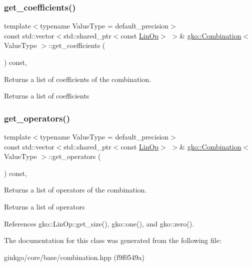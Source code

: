 \subsubsection{\texorpdfstring{get\+\_\+coefficients()}{get\_coefficients()}}
{\footnotesize\ttfamily template$<$typename Value\+Type  = default\+\_\+precision$>$ \\
const std\+::vector$<$std\+::shared\+\_\+ptr$<$const \hyperlink{classgko_1_1LinOp}{Lin\+Op}$>$ $>$\& \hyperlink{classgko_1_1Combination}{gko\+::\+Combination}$<$ Value\+Type $>$\+::get\+\_\+coefficients (\begin{DoxyParamCaption}{ }\end{DoxyParamCaption}) const\hspace{0.3cm}{\ttfamily [inline]}, {\ttfamily [noexcept]}}



Returns a list of coefficients of the combination. 

\begin{DoxyReturn}{Returns}
a list of coefficients 
\end{DoxyReturn}
\mbox{\label{classgko_1_1Combination_a75a81c2b91441ddea98949ef54f62441}} 
\subsubsection{\texorpdfstring{get\+\_\+operators()}{get\_operators()}}
{\footnotesize\ttfamily template$<$typename Value\+Type  = default\+\_\+precision$>$ \\
const std\+::vector$<$std\+::shared\+\_\+ptr$<$const \hyperlink{classgko_1_1LinOp}{Lin\+Op}$>$ $>$\& \hyperlink{classgko_1_1Combination}{gko\+::\+Combination}$<$ Value\+Type $>$\+::get\+\_\+operators (\begin{DoxyParamCaption}{ }\end{DoxyParamCaption}) const\hspace{0.3cm}{\ttfamily [inline]}, {\ttfamily [noexcept]}}



Returns a list of operators of the combination. 

\begin{DoxyReturn}{Returns}
a list of operators 
\end{DoxyReturn}


References gko\+::\+Lin\+Op\+::get\+\_\+size(), gko\+::one(), and gko\+::zero().



The documentation for this class was generated from the following file\+:\begin{DoxyCompactItemize}
\item 
ginkgo/core/base/combination.\+hpp (f9f0549a)\end{DoxyCompactItemize}
